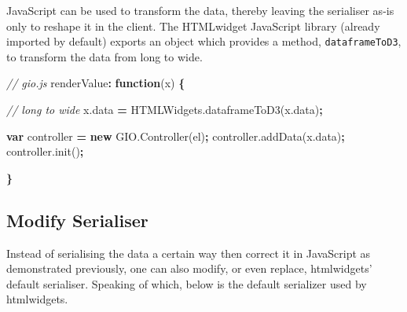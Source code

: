 \documentclass[
]{krantz}
\makeatletter
\newenvironment{Shaded}{\begin{snugshade}}{\end{snugshade}}
\newcommand{\AttributeTok}[1]{\textcolor[rgb]{0.61,0.61,0.61}{#1}}
\newcommand{\CommentTok}[1]{\textcolor[rgb]{0.37,0.37,0.37}{\textit{#1}}}
\newcommand{\KeywordTok}[1]{\textcolor[rgb]{0.27,0.27,0.27}{\textbf{#1}}}
\newcommand{\NormalTok}[1]{#1}
\newcommand{\OperatorTok}[1]{\textcolor[rgb]{0.43,0.43,0.43}{\textbf{#1}}}
\newcommand{\VariableTok}[1]{\textcolor[rgb]{0,0,0}{#1}}
\newenvironment{kframe}{%
\medskip{}
\setlength{\fboxsep}{.8em}
 \def\at@end@of@kframe{}%
 \ifinner\ifhmode%
  \def\at@end@of@kframe{\end{minipage}}%
  \begin{minipage}{\columnwidth}%
 \fi\fi%
 \def\FrameCommand##1{\hskip\@totalleftmargin \hskip-\fboxsep
 \colorbox{shadecolor}{##1}\hskip-\fboxsep
     \hskip-\linewidth \hskip-\@totalleftmargin \hskip\columnwidth}%
 \MakeFramed {\advance\hsize-\width
   \@totalleftmargin\z@ \linewidth\hsize
   \@setminipage}}%
 {\par\unskip\endMakeFramed%
 \at@end@of@kframe}
\renewenvironment{Shaded}{\begin{kframe}}{\end{kframe}}
\makeatother
\begin{document}
JavaScript can be used to transform the data, thereby leaving the serialiser as-is only to reshape it in the client. The HTMLwidget JavaScript library (already imported by default) exports an object which provides a method, \texttt{dataframeToD3}, to transform the data from long to wide.

\begin{Shaded}
\begin{Highlighting}[]
\CommentTok{// gio.js}
\NormalTok{renderValue}\OperatorTok{:} \KeywordTok{function}\NormalTok{(x) }\OperatorTok{\{}

  \CommentTok{// long to wide}
  \VariableTok{x}\NormalTok{.}\AttributeTok{data} \OperatorTok{=} \VariableTok{HTMLWidgets}\NormalTok{.}\AttributeTok{dataframeToD3}\NormalTok{(}\VariableTok{x}\NormalTok{.}\AttributeTok{data}\NormalTok{)}\OperatorTok{;}

  \KeywordTok{var}\NormalTok{ controller }\OperatorTok{=} \KeywordTok{new} \VariableTok{GIO}\NormalTok{.}\AttributeTok{Controller}\NormalTok{(el)}\OperatorTok{;}
  \VariableTok{controller}\NormalTok{.}\AttributeTok{addData}\NormalTok{(}\VariableTok{x}\NormalTok{.}\AttributeTok{data}\NormalTok{)}\OperatorTok{;} 
  \VariableTok{controller}\NormalTok{.}\AttributeTok{init}\NormalTok{()}\OperatorTok{;}

\OperatorTok{\}}
\end{Highlighting}
\end{Shaded}

\hypertarget{widgets-full-transform-data-modify}{%
\subsection{Modify Serialiser}\label{widgets-full-transform-data-modify}}

Instead of serialising the data a certain way then correct it in JavaScript as demonstrated previously, one can also modify, or even replace, htmlwidgets' default serialiser. Speaking of which, below is the default serializer used by htmlwidgets.
\end{document}
